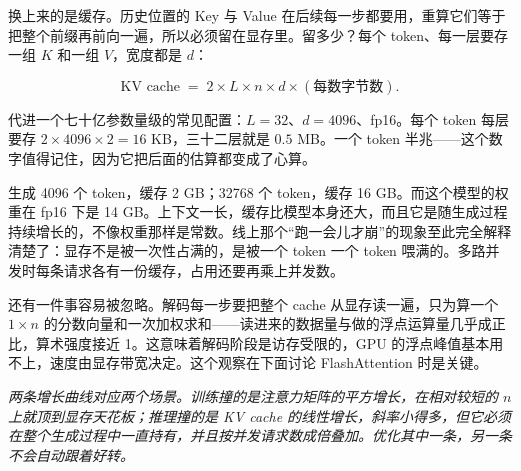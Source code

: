 换上来的是缓存。历史位置的 Key 与 Value 在后续每一步都要用，重算它们等于把整个前缀再前向一遍，所以必须留在显存里。留多少？每个 token、每一层要存一组 \(K\) 和一组 \(V\)，宽度都是 \(d\)：

\[
\text{KV cache} \;=\; 2 \times L \times n \times d \times (\text{每数字节数}).
\]

代进一个七十亿参数量级的常见配置：\(L=32\)、\(d=4096\)、fp16。每个 token 每层要存 \(2\times 4096\times 2=16\) KB，三十二层就是 \(0.5\) MB。一个 token 半兆——这个数字值得记住，因为它把后面的估算都变成了心算。

生成 4096 个 token，缓存 2 GB；32768 个 token，缓存 16 GB。而这个模型的权重在 fp16 下是 14 GB。上下文一长，缓存比模型本身还大，而且它是随生成过程持续增长的，不像权重那样是常数。线上那个``跑一会儿才崩''的现象至此完全解释清楚了：显存不是被一次性占满的，是被一个 token 一个 token 喂满的。多路并发时每条请求各有一份缓存，占用还要再乘上并发数。

还有一件事容易被忽略。解码每一步要把整个 cache 从显存读一遍，只为算一个 \(1\times n\) 的分数向量和一次加权求和——读进来的数据量与做的浮点运算量几乎成正比，算术强度接近 1。这意味着解码阶段是访存受限的，GPU 的浮点峰值基本用不上，速度由显存带宽决定。这个观察在下面讨论 FlashAttention 时是关键。

\begin{center}
\end{center}

\emph{两条增长曲线对应两个场景。训练撞的是注意力矩阵的平方增长，在相对较短的 \(n\) 上就顶到显存天花板；推理撞的是 KV cache 的线性增长，斜率小得多，但它必须在整个生成过程中一直持有，并且按并发请求数成倍叠加。优化其中一条，另一条不会自动跟着好转。}


